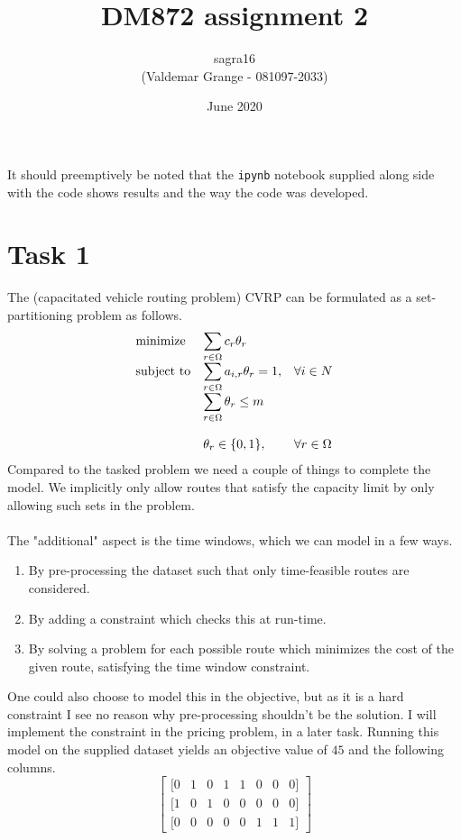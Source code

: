 \documentclass{article}
\title{DM872 assignment 2}
\author{sagra16 \\(Valdemar Grange - 081097-2033) }
\date{June 2020}
\begin{document}
    \maketitle
    It should preemptively be noted that the \texttt{ipynb} notebook supplied along side with the code shows results and the way the code was developed.
    
    \clearpage

    \section{Task 1}
    The (capacitated vehicle routing problem) CVRP can be formulated as a set-partitioning problem as follows.
    \begin{equation*}
        \begin{array}{ll@{}ll}
            \text{minimize}  & \displaystyle\sum_{r \in \Omega} c_r \theta_r& &\\
            \text{subject to}& \displaystyle\sum_{r \in \Omega} a_{i, r} \theta_r = 1 ,&   &\forall i \in N\\
                             & \displaystyle\sum_{r \in \Omega} \theta_r \leq m &&\\\\
                             & \displaystyle \theta_r  \in \{0,1\},  && \forall r \in \Omega
        \end{array}
    \end{equation*}
    Compared to the tasked problem we need a couple of things to complete the model.
    We implicitly only allow routes that satisfy the capacity limit by only allowing such sets in the problem.\\\\
    The "additional" aspect is the time windows, which we can model in a few ways.
    \begin{enumerate}
        \item By pre-processing the dataset such that only time-feasible routes are considered.
        \item By adding a constraint which checks this at run-time.
        \item By solving a problem for each possible route which minimizes the cost of the given route, satisfying the time window constraint.
    \end{enumerate}
    One could also choose to model this in the objective, but as it is a hard constraint I see no reason why pre-processing shouldn't be the solution.
    I will implement the constraint in the pricing problem, in a later task.
    Running this model on the supplied dataset yields an objective value of $45$ and the following columns.
    \[
        \begin{bmatrix}
            [0 & 1 & 0 & 1 & 1 & 0 & 0 & 0]\\
            [1 & 0 & 1 & 0 & 0 & 0 & 0 & 0]\\
            [0 & 0 & 0 & 0 & 0 & 1 & 1 & 1]
        \end{bmatrix}
    \]
\end{document}
